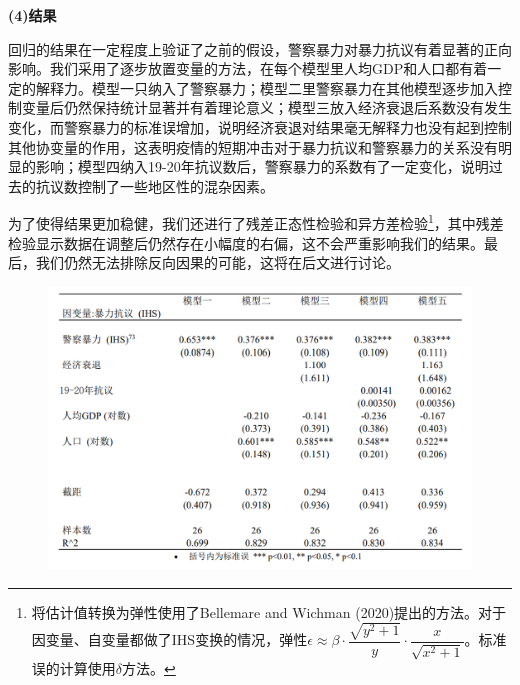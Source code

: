 \documentclass{phyasgn}\usepackage{nag}
\begin{document}
\par \textbf{(4)结果}
\par 回归的结果在一定程度上验证了之前的假设，警察暴力对暴力抗议有着显著的正向影响。我们采用了逐步放置变量的方法，在每个模型里人均GDP和人口都有着一定的解释力。模型一只纳入了警察暴力；模型二里警察暴力在其他模型逐步加入控制变量后仍然保持统计显著并有着理论意义；模型三放入经济衰退后系数没有发生变化，而警察暴力的标准误增加，说明经济衰退对结果毫无解释力也没有起到控制其他协变量的作用，这表明疫情的短期冲击对于暴力抗议和警察暴力的关系没有明显的影响；模型四纳入19-20年抗议数后，警察暴力的系数有了一定变化，说明过去的抗议数控制了一些地区性的混杂因素。
\par 为了使得结果更加稳健，我们还进行了残差正态性检验和异方差检验\footnote[68]{将估计值转换为弹性使用了Bellemare and Wichman (2020)提出的方法。对于因变量、自变量都做了IHS变换的情况，弹性$\epsilon\approx\beta\cdot\dfrac{\sqrt{y^{2}+1}}{y}\cdot\dfrac{x}{\sqrt{x^{2}+1}}$。标准误的计算使用$\delta$方法。}，其中残差检验显示数据在调整后仍然存在小幅度的右偏，这不会严重影响我们的结果。最后，我们仍然无法排除反向因果的可能，这将在后文进行讨论。
\begin{figure}[!h]
                    	\centering
                    	\includegraphics[width=.9\linewidth]{pic/17.png}
                    	\end{figure}
\end{document}
